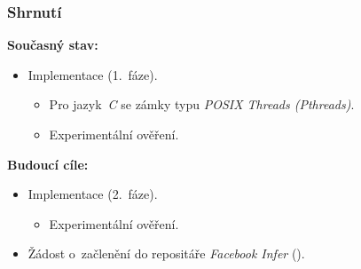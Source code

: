 \documentclass[10pt, xcolor=pdflatex, hyperref={unicode}]{beamer}
\begin{document}
\begin{frame}\frametitle{Shrnutí}
	\textbf{Současný stav:}
	\begin{itemize}
		\setlength\itemsep{0.5em}

		\item
			Implementace 
			(1.~fáze).

			\begin{itemize}
				\setlength\itemsep{0.5em}

				\item
					Pro jazyk~\emph{C} se zámky typu
					\emph{POSIX Threads (Pthreads)}.

				\item
					Experimentální ověření.
			\end{itemize}
	\end{itemize}

	\medskip

	\textbf{Budoucí cíle:}
	\begin{itemize}
		\setlength\itemsep{0.5em}

		\item
			Implementace 
			(2.~fáze).

			\begin{itemize}
				\setlength\itemsep{0.5em}

				\item
					Experimentální ověření.
			\end{itemize}

		\item
			Žádost o~začlenění do repositáře
			\emph{Facebook Infer}
			().
	\end{itemize}
\end{frame}
\end{document}
